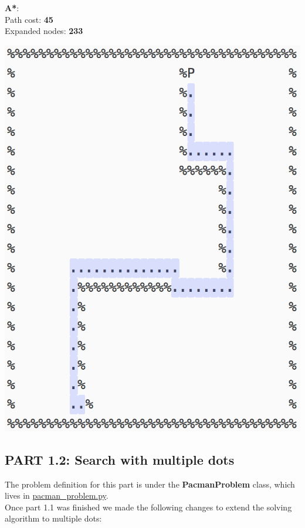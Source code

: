 \documentclass[11pt]{article}
\begin{document}
\textbf{A*}:\\
Path cost: \textbf{45}\\
Expanded nodes: \textbf{233}
\begin{center}
\includegraphics[scale=1]{open-maze/a-star.png}
\end{center}
\pagebreak

\subsection*{PART 1.2: Search with multiple dots}
The problem definition for this part is under the \textbf{PacmanProblem} class, which lives in \href{https://github.com/nbermudezs/UIUC_CS440/tree/master/assignment1/part1/pacman\_problem.py}{pacman\_problem.py}.\\
 
Once part 1.1 was finished we made the following changes to extend the solving algorithm to multiple dots:
\end{document}
